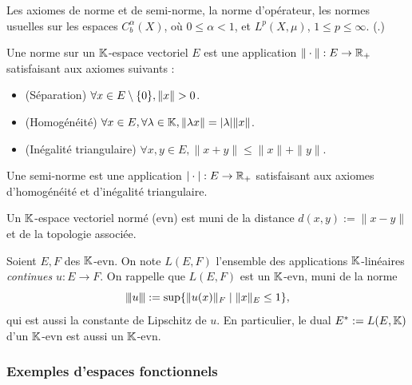 \begin{retenir}
Les axiomes de norme et de semi-norme, la norme d'opérateur, les normes usuelles sur les espaces $C_b^\alpha(X)$, où $0 \leq \alpha < 1$, et $L^p(X,\mu)$, $1 \leq p \leq \infty$. 
(.)
\end{retenir}


\begin{definition}[Norme]
\label{def:norme}
%
	Une norme sur un $\mathbb{K}$-espace vectoriel $E$ est une application $\|\cdot\| : E \to \mathbb{R}_+$ satisfaisant aux axiomes suivants : 
	\begin{itemize}
		\item (Séparation) $\forall x \in E\sm \{0\}, \|x\|>0$.
		\item (Homogénéité) $\forall x\in E, \forall \lambda \in \mathbb{K}, \|\lambda x\| = |\lambda| \|x\|$.
		\item (Inégalité triangulaire) $\forall x,y \in E, \|x+y\|\leq \|x\| + \|y\|$. 
	\end{itemize}
	Une semi-norme est une application $|\cdot| : E \to \mathbb{R}_+$ satisfaisant aux axiomes d'homogénéité et d'inégalité triangulaire. 
\end{definition}

Un $\mathbb{K}$-espace vectoriel normé (evn) est muni de la distance $d(x,y) := \|x-y\|$ et de la topologie associée. 

\begin{definition}
\label{def:normeOperateur}
%
	Soient $E,F$ des $\mathbb{K}$-evn. On note $L(E,F)$ l'ensemble des applications $\mathbb{K}$-linéaires \emph{continues} $u : E \to F$. On rappelle que $L(E,F)$ est un $\mathbb{K}$-evn, muni de la norme 
	\begin{equation}
		{\left\vert\kern-0.25ex\left\vert\kern-0.25ex\left\vert u \right\vert\kern-0.25ex\right\vert\kern-0.25ex\right\vert} := \sup\{ \|u (x)\|_F \mid \|x\|_E\leq 1\},
	\end{equation}
	qui est aussi la constante de Lipschitz de $u$. 
	En particulier, le dual $E^* := L(E,\mathbb{K})$ d'un $\mathbb{K}$-evn est aussi un $\mathbb{K}$-evn. 
\end{definition}

\subsubsection{Exemples d'espaces fonctionnels}

